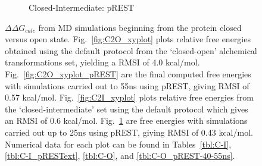 \begin{figure}[!ht]
\begin{subfigure}{.5\textwidth}
   \caption{Closed-Intermediate: pREST}
   \label{fig:C2I_xyplot_pREST}
\end{subfigure}\hfill
\caption{$\Delta\Delta G_{calc}$ from MD simulations beginning from the protein closed versus open state. 
Fig.~\ref{fig:C2O_xyplot} plots relative free energies obtained using the default protocol from the `closed-open' alchemical transformations set, yielding a RMSI of 4.0 kcal/mol. 
Fig.~\ref{fig:C2O_xyplot_pREST} are the final computed free energies with simulations carried out to 55ns using pREST, giving RMSI of 0.57 kcal/mol. 
Fig.~\ref{fig:C2I_xyplot} plots relative free energies from the `closed-intermediate' set using the default protocol which gives an RMSI of 0.6 kcal/mol. 
Fig.~\ref{fig:C2I_xyplot_pREST} are free energies with simulations carried out up to 25ns using pREST, giving RMSI of 0.43 kcal/mol. 
Numerical data for each plot can be found in Tables~\ref{tbl:C-I}, \ref{tbl:C-I_pRESText}, \ref{tbl:C-O}, and \ref{tbl:C-O_pREST-40-55ns}.
}
\label{fig:conf-xyplots}
\end{figure}



